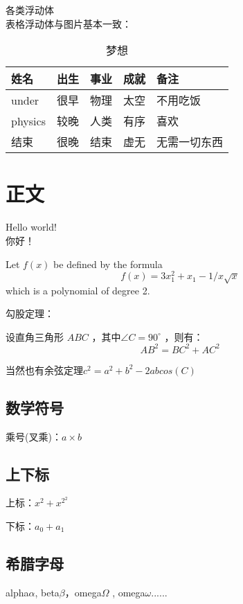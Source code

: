 \documentclass[10pt]{ctexart}%
\newcommand{\degree}{^\circ}%
\begin{document}
    各类浮动体\\
    
    表格浮动体与图片基本一致：\\
    \begin{table}[h]
    \caption{梦想}
    \centering
    	    \begin{tabular}{l||c c c| p{1.5cm}}%
    		姓名 & 出生 & 事业 & 成就 & 备注\\
    		\hline
    		under & 很早 & 物理 & 太空 & 不用吃饭\\
    		physics & 较晚 & 人类 & 有序 & 喜欢\\
    		\hline \hline
    		结束 & 很晚 & 结束 & 虚无 & 无需一切东西\\
    	\end{tabular}
    \end{table}




	\section{正文}
	Hello world!\\你好！
	
	Let $f(x)$ be defined by the formula
	$$f(x)={3x_{1}^{2}+x_{1}-1}/{x\sqrt{x}}$$%
	 which is a polynomial of degree 2.
	
	勾股定理：\par %
	设直角三角形 \(ABC\) ，其中$\angle C=90\degree $%
	，则有：
	\begin{equation}
		AB^2 = BC^2 + AC^2
	\end{equation}%
	
	当然也有余弦定理\begin{math}
		c^2=a^2+b^2-2abcos(C)
	\end{math}%
	\subsection{数学符号}
	乘号(叉乘)：$a \times b$
	\subsection{上下标}
	上标：$x^2+x^{2^2}$
	
	下标：$a_0+a_1$
	
	\subsection{希腊字母}
	alpha$\alpha$, beta$\beta$，omega$\Omega$ , omega$\omega$......
\end{document}

